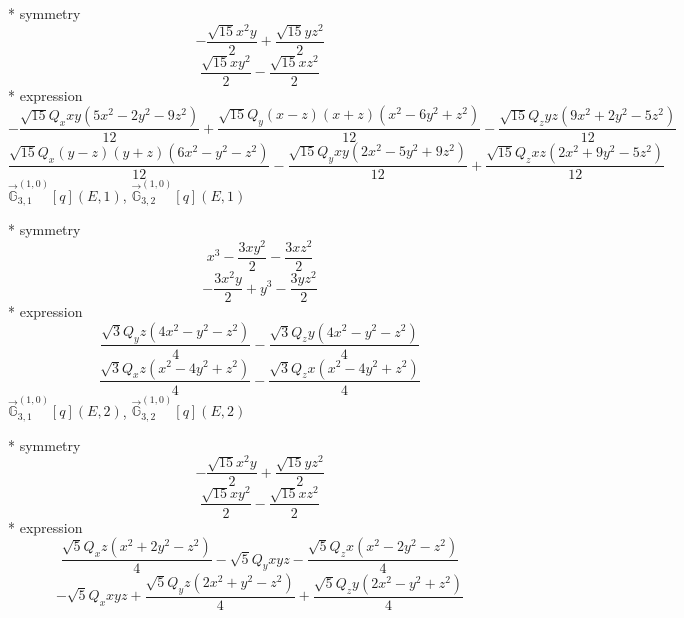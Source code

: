 \documentclass[fleqn,8pt]{jsarticle}
\begin{document}
\noindent\quad ** symmetry
\begin{dmath*}
- \frac{\sqrt{15} x^{2} y}{2} + \frac{\sqrt{15} y z^{2}}{2}
\end{dmath*}
\begin{dmath*}
\frac{\sqrt{15} x y^{2}}{2} - \frac{\sqrt{15} x z^{2}}{2}
\end{dmath*}
\noindent\quad ** expression
\begin{dmath*}
- \frac{\sqrt{15} Q_{x} x y \left(5 x^{2} - 2 y^{2} - 9 z^{2}\right)}{12} + \frac{\sqrt{15} Q_{y} \left(x - z\right) \left(x + z\right) \left(x^{2} - 6 y^{2} + z^{2}\right)}{12} - \frac{\sqrt{15} Q_{z} y z \left(9 x^{2} + 2 y^{2} - 5 z^{2}\right)}{12}
\end{dmath*}
\begin{dmath*}
\frac{\sqrt{15} Q_{x} \left(y - z\right) \left(y + z\right) \left(6 x^{2} - y^{2} - z^{2}\right)}{12} - \frac{\sqrt{15} Q_{y} x y \left(2 x^{2} - 5 y^{2} + 9 z^{2}\right)}{12} + \frac{\sqrt{15} Q_{z} x z \left(2 x^{2} + 9 y^{2} - 5 z^{2}\right)}{12}
\end{dmath*}
\noindent\quad $\vec{\mathbb{G}}_{3,1}^{(1,0)}[q](E,1)$, $\vec{\mathbb{G}}_{3,2}^{(1,0)}[q](E,1)$

\noindent\quad ** symmetry
\begin{dmath*}
x^{3} - \frac{3 x y^{2}}{2} - \frac{3 x z^{2}}{2}
\end{dmath*}
\begin{dmath*}
- \frac{3 x^{2} y}{2} + y^{3} - \frac{3 y z^{2}}{2}
\end{dmath*}
\noindent\quad ** expression
\begin{dmath*}
\frac{\sqrt{3} Q_{y} z \left(4 x^{2} - y^{2} - z^{2}\right)}{4} - \frac{\sqrt{3} Q_{z} y \left(4 x^{2} - y^{2} - z^{2}\right)}{4}
\end{dmath*}
\begin{dmath*}
\frac{\sqrt{3} Q_{x} z \left(x^{2} - 4 y^{2} + z^{2}\right)}{4} - \frac{\sqrt{3} Q_{z} x \left(x^{2} - 4 y^{2} + z^{2}\right)}{4}
\end{dmath*}
\noindent\quad $\vec{\mathbb{G}}_{3,1}^{(1,0)}[q](E,2)$, $\vec{\mathbb{G}}_{3,2}^{(1,0)}[q](E,2)$

\noindent\quad ** symmetry
\begin{dmath*}
- \frac{\sqrt{15} x^{2} y}{2} + \frac{\sqrt{15} y z^{2}}{2}
\end{dmath*}
\begin{dmath*}
\frac{\sqrt{15} x y^{2}}{2} - \frac{\sqrt{15} x z^{2}}{2}
\end{dmath*}
\noindent\quad ** expression
\begin{dmath*}
\frac{\sqrt{5} Q_{x} z \left(x^{2} + 2 y^{2} - z^{2}\right)}{4} - \sqrt{5} Q_{y} x y z - \frac{\sqrt{5} Q_{z} x \left(x^{2} - 2 y^{2} - z^{2}\right)}{4}
\end{dmath*}
\begin{dmath*}
- \sqrt{5} Q_{x} x y z + \frac{\sqrt{5} Q_{y} z \left(2 x^{2} + y^{2} - z^{2}\right)}{4} + \frac{\sqrt{5} Q_{z} y \left(2 x^{2} - y^{2} + z^{2}\right)}{4}
\end{dmath*}
\end{document}
